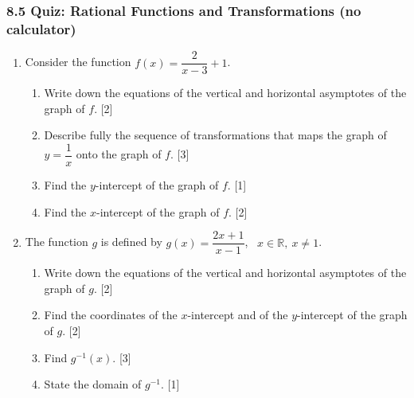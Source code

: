 \documentclass[12pt, twoside]{article}
\begin{document}
\subsubsection*{8.5 Quiz: Rational Functions and Transformations (no calculator)}

\begin{enumerate}[itemsep=0.15cm]

\item[1.] [Maximum mark: 8]

Consider the function $f(x) = \dfrac{2}{x - 3} + 1$.

\begin{enumerate}[itemsep=0.15cm]
  \item Write down the equations of the vertical and horizontal asymptotes of the graph of $f$. \hfill [2]
  \item Describe fully the sequence of transformations that maps the graph of $y = \dfrac{1}{x}$ onto the graph of $f$. \hfill [3]
  \item Find the $y$-intercept of the graph of $f$. \hfill [1]
  \item Find the $x$-intercept of the graph of $f$. \hfill [2]
\end{enumerate}


\newpage

\item[2.] [Maximum mark: 8]

The function $g$ is defined by $g(x) = \dfrac{2x + 1}{x - 1}$, \ $x \in \mathbb{R}, \ x \ne 1$.

\begin{enumerate}[itemsep=0.15cm]
  \item Write down the equations of the vertical and horizontal asymptotes of the graph of $g$. \hfill [2]
  \item Find the coordinates of the $x$-intercept and of the $y$-intercept of the graph of $g$. \hfill [2]
  \item Find $g^{-1}(x)$. \hfill [3]
  \item State the domain of $g^{-1}$. \hfill [1]
\end{enumerate}


\end{enumerate}
\end{document}
